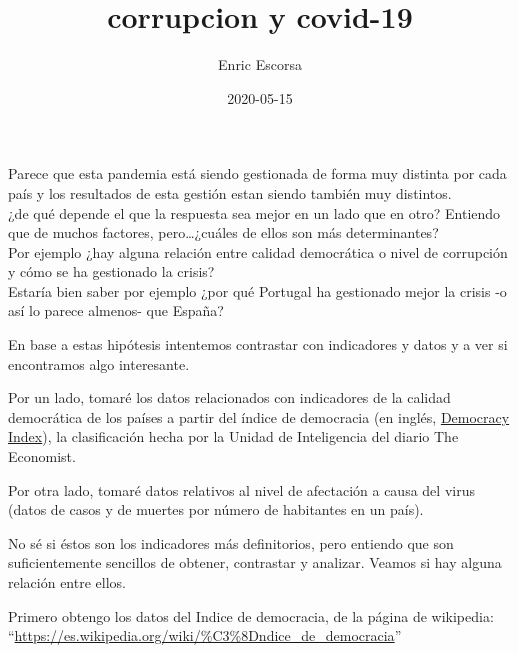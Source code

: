 \documentclass[
]{article}
\title{corrupcion y covid-19}
\author{Enric Escorsa}
\date{2020-05-15}
\begin{document}
\maketitle

Parece que esta pandemia está siendo gestionada de forma muy distinta
por cada país y los resultados de esta gestión estan siendo también muy
distintos.\\
¿de qué depende el que la respuesta sea mejor en un lado que en otro?
Entiendo que de muchos factores, pero\ldots¿cuáles de ellos son más
determinantes?\\
Por ejemplo ¿hay alguna relación entre calidad democrática o nivel de
corrupción y cómo se ha gestionado la crisis?\\
Estaría bien saber por ejemplo ¿por qué Portugal ha gestionado mejor la
crisis -o así lo parece almenos- que España?

En base a estas hipótesis intentemos contrastar con indicadores y datos
y a ver si encontramos algo interesante.

Por un lado, tomaré los datos relacionados con indicadores de la calidad
democrática de los países a partir del índice de democracia (en inglés,
\href{https://es.wikipedia.org/wiki/\%C3\%8Dndice_de_democracia}{Democracy
Index}), la clasificación hecha por la Unidad de Inteligencia del diario
The Economist.

Por otra lado, tomaré datos relativos al nivel de afectación a causa del
virus (datos de casos y de muertes por número de habitantes en un país).

No sé si éstos son los indicadores más definitorios, pero entiendo que
son suficientemente sencillos de obtener, contrastar y analizar. Veamos
si hay alguna relación entre ellos.

Primero obtengo los datos del Indice de democracia, de la página de
wikipedia:
``\url{https://es.wikipedia.org/wiki/\%C3\%8Dndice_de_democracia}''
\end{document}
